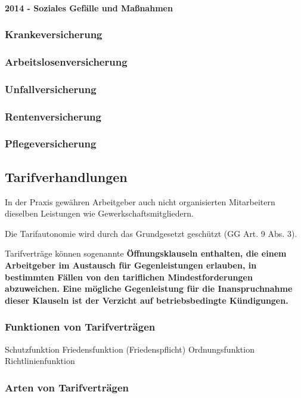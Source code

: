 \paragraph{2014 - Soziales Gefälle und Maßnahmen}

\subsubsection{Krankeversicherung}
\subsubsection{Arbeitslosenversicherung}
\subsubsection{Unfallversicherung}
\subsubsection{Rentenversicherung}
\subsubsection{Pflegeversicherung}

\subsection{Tarifverhandlungen}

In der Praxis gewähren Arbeitgeber auch nicht organisierten Mitarbeitern dieselben Leistungen wie Gewerkschaftsmitgliedern.

Die Tarifautonomie wird durch das Grundgesetzt geschützt (GG Art. 9 Abs. 3).

Tarifverträge können sogenannte \bf{Öffnungsklauseln} enthalten, die einem Arbeitgeber im Austausch für Gegenleistungen erlauben, in bestimmten Fällen von den tariflichen Mindestforderungen abzuweichen. Eine mögliche Gegenleistung für die Inanspruchnahme dieser Klauseln ist der Verzicht auf betriebsbedingte Kündigungen.

\subsubsection{Funktionen von Tarifverträgen}

Schutzfunktion
Friedensfunktion (Friedenspflicht)
Ordnungsfunktion
Richtlinienfunktion

\subsubsection{Arten von Tarifverträgen}

